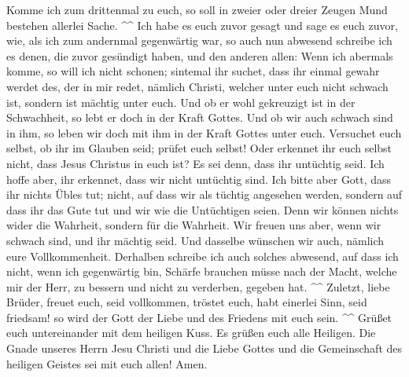  Komme ich zum drittenmal zu euch, so soll in zweier oder
dreier Zeugen Mund bestehen allerlei Sache. \^{}\^{}  Ich
habe es euch zuvor gesagt und sage es euch zuvor, wie, als ich zum
andernmal gegenwärtig war, so auch nun abwesend schreibe ich es denen,
die zuvor gesündigt haben, und den anderen allen: Wenn ich abermals
komme, so will ich nicht schonen;  sintemal ihr suchet,
dass ihr einmal gewahr werdet des, der in mir redet, nämlich Christi,
welcher unter euch nicht schwach ist, sondern ist mächtig unter euch.
 Und ob er wohl gekreuzigt ist in der Schwachheit, so lebt
er doch in der Kraft Gottes. Und ob wir auch schwach sind in ihm, so
leben wir doch mit ihm in der Kraft Gottes unter euch. 
Versuchet euch selbst, ob ihr im Glauben seid; prüfet euch selbst! Oder
erkennet ihr euch selbst nicht, dass Jesus Christus in euch ist? Es sei
denn, dass ihr untüchtig seid.  Ich hoffe aber, ihr
erkennet, dass wir nicht untüchtig sind.  Ich bitte aber
Gott, dass ihr nichts Übles tut; nicht, auf dass wir als tüchtig
angesehen werden, sondern auf dass ihr das Gute tut und wir wie die
Untüchtigen seien.  Denn wir können nichts wider die
Wahrheit, sondern für die Wahrheit.  Wir freuen uns aber,
wenn wir schwach sind, und ihr mächtig seid. Und dasselbe wünschen wir
auch, nämlich eure Vollkommenheit.  Derhalben schreibe
ich auch solches abwesend, auf dass ich nicht, wenn ich gegenwärtig bin,
Schärfe brauchen müsse nach der Macht, welche mir der Herr, zu bessern
und nicht zu verderben, gegeben hat. \^{}\^{}  Zuletzt,
liebe Brüder, freuet euch, seid vollkommen, tröstet euch, habt einerlei
Sinn, seid friedsam! so wird der Gott der Liebe und des Friedens mit
euch sein. \^{}\^{}  Grüßet euch untereinander mit dem
heiligen Kuss. Es grüßen euch alle Heiligen.  Die Gnade
unseres Herrn Jesu Christi und die Liebe Gottes und die Gemeinschaft des
heiligen Geistes sei mit euch allen! Amen.
